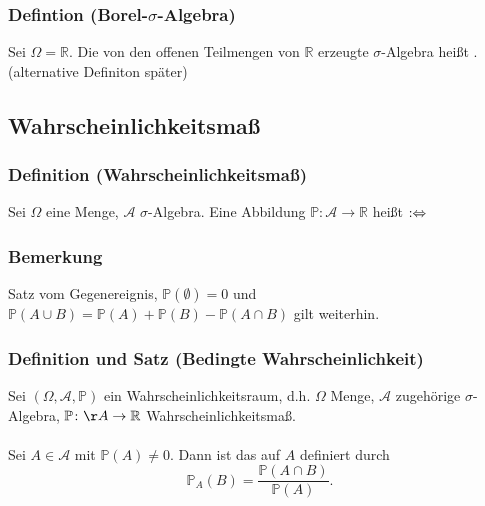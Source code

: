 \subsubsection{Defintion (Borel-$\sigma$-Algebra)}
Sei $\Omega=\mathbb{R}$. Die von den offenen Teilmengen von $\mathbb{R}$ erzeugte $\sigma$-Algebra hei\ss{}t . (alternative Definiton sp\"ater)
\subsection{Wahrscheinlichkeitsma\ss{}}
\subsubsection{Definition (Wahrscheinlichkeitsma\ss{})}
Sei $\Omega$ eine Menge, $\mathcal{A}$ $\sigma$-Algebra. Eine Abbildung $\mathbb{P}\colon\mathcal{A}\to\mathbb{R}$ hei\ss{}t  $:\Leftrightarrow$
\subsubsection{Bemerkung}
Satz vom Gegenereignis, $\mathbb{P}(\emptyset)=0$ und $\mathbb{P}(A\cup B)=\mathbb{P}(A)+\mathbb{P}(B)-\mathbb{P}(A\cap B)$ gilt weiterhin.
\subsubsection{Definition und Satz (Bedingte Wahrscheinlichkeit)}
Sei $(\Omega,\mathcal{A},\mathbb{P})$ ein Wahrscheinlichkeitsraum, d.h. $\Omega$ Menge, $\mathcal{A}$ zugeh\"orige $\sigma$-Algebra, $\mathbb{P}\colon\AA\to\mathbb{R}$ Wahrscheinlichkeitsma\ss{}.
\\~\\
Sei $A\in\mathcal{A}$ mit $\mathbb{P}(A)\neq0$. Dann ist das auf $A$  definiert durch
\[
\mathbb{P}_A(B)=\frac{\mathbb{P}(A\cap B)}{\mathbb{P}(A)}.
\]
